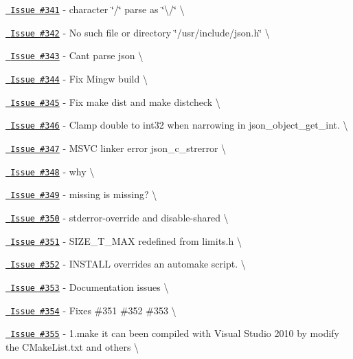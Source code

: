 \begin{DoxyItemize}
\item \href{https://github.com/json-c/json-c/issues/341}{\texttt{ Issue \#341}} -\/ character \char`\"{}/\char`\"{} parse as \char`\"{}\textbackslash{}/\char`\"{} \textbackslash{}
\item \href{https://github.com/json-c/json-c/issues/342}{\texttt{ Issue \#342}} -\/ No such file or directory \char`\"{}/usr/include/json.\+h\char`\"{} \textbackslash{}
\item \href{https://github.com/json-c/json-c/issues/343}{\texttt{ Issue \#343}} -\/ Can\textquotesingle{}t parse json \textbackslash{}
\item \href{https://github.com/json-c/json-c/issues/344}{\texttt{ Issue \#344}} -\/ Fix Mingw build \textbackslash{}
\item \href{https://github.com/json-c/json-c/issues/345}{\texttt{ Issue \#345}} -\/ Fix make dist and make distcheck \textbackslash{}
\item \href{https://github.com/json-c/json-c/issues/346}{\texttt{ Issue \#346}} -\/ Clamp double to int32 when narrowing in json\+\_\+object\+\_\+get\+\_\+int. \textbackslash{}
\item \href{https://github.com/json-c/json-c/issues/347}{\texttt{ Issue \#347}} -\/ MSVC linker error json\+\_\+c\+\_\+strerror \textbackslash{}
\item \href{https://github.com/json-c/json-c/issues/348}{\texttt{ Issue \#348}} -\/ why \textbackslash{}
\item \href{https://github.com/json-c/json-c/issues/349}{\texttt{ Issue \#349}} -\/ {\ttfamily missing} is missing? \textbackslash{}
\item \href{https://github.com/json-c/json-c/issues/350}{\texttt{ Issue \#350}} -\/ stderror-\/override and disable-\/shared \textbackslash{}
\item \href{https://github.com/json-c/json-c/issues/351}{\texttt{ Issue \#351}} -\/ SIZE\+\_\+\+T\+\_\+\+MAX redefined from limits.\+h \textbackslash{}
\item \href{https://github.com/json-c/json-c/issues/352}{\texttt{ Issue \#352}} -\/ {\ttfamily INSTALL} overrides an automake script. \textbackslash{}
\item \href{https://github.com/json-c/json-c/issues/353}{\texttt{ Issue \#353}} -\/ Documentation issues \textbackslash{}
\item \href{https://github.com/json-c/json-c/issues/354}{\texttt{ Issue \#354}} -\/ Fixes \#351 \#352 \#353 \textbackslash{}
\item \href{https://github.com/json-c/json-c/issues/355}{\texttt{ Issue \#355}} -\/ 1.\+make it can been compiled with Visual Studio 2010 by modify the CMake\+List.\+txt and others \textbackslash{}

\end{DoxyItemize}
